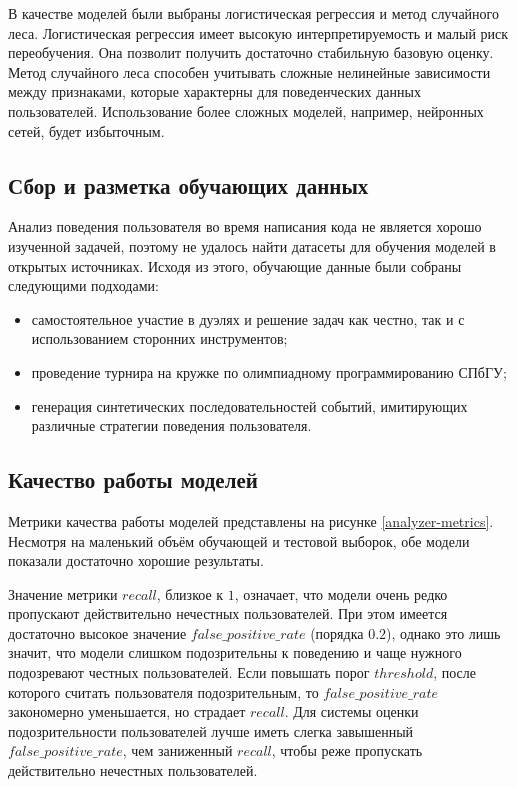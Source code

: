 В качестве моделей были выбраны логистическая регрессия и метод случайного леса.
Логистическая регрессия имеет высокую интерпретируемость и малый риск переобучения.
Она позволит получить достаточно стабильную базовую оценку.
Метод случайного леса способен учитывать сложные нелинейные зависимости между признаками,
которые характерны для поведенческих данных пользователей.
Использование более сложных моделей, например, нейронных сетей, будет избыточным.

\subsection{Сбор и разметка обучающих данных}

Анализ поведения пользователя во время написания кода не является хорошо изученной задачей,
поэтому не удалось найти датасеты для обучения моделей в открытых источниках.
Исходя из этого, обучающие данные были собраны следующими подходами:
\begin{itemize}
\item самостоятельное участие в дуэлях и решение задач как честно, так и с использованием сторонних инструментов;
\item проведение турнира на кружке по олимпиадному программированию СПбГУ;
\item генерация синтетических последовательностей событий, имитирующих различные стратегии поведения пользователя.
\end{itemize}

\subsection{Качество работы моделей}

Метрики качества работы моделей представлены на рисунке \ref{analyzer-metrics}.
Несмотря на маленький объём обучающей и тестовой выборок, обе модели показали достаточно хорошие результаты.

Значение метрики $recall$, близкое к $1$, означает, что модели очень редко пропускают действительно нечестных пользователей.
При этом имеется достаточно высокое значение $false\_positive\_rate$ (порядка $0.2$),
однако это лишь значит, что модели слишком подозрительны к поведению и чаще нужного подозревают честных пользователей.
Если повышать порог $threshold$, после которого считать пользователя подозрительным,
то $false\_positive\_rate$ закономерно уменьшается, но страдает $recall$.
Для системы оценки подозрительности пользователей лучше иметь слегка завышенный $false\_positive\_rate$, чем заниженный $recall$,
чтобы реже пропускать действительно нечестных пользователей.

